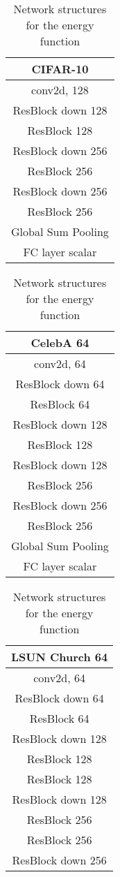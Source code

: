 \documentclass{article} \usepackage{iclr2021_conference,times}
\begin{document}
\begin{table}[ht]
\small
  \caption{Network structures for the energy function }\label{table net struct}
     \centering
     \begin{tabular}{c}
     CIFAR-10\\
     \hline
      conv2d, 128\\
     ResBlock down 128\\
     ResBlock 128\\
     ResBlock down 256\\
     ResBlock 256\\
     ResBlock down 256\\
     ResBlock 256\\
     Global Sum Pooling\\
     FC layer  scalar\\
     \hline
     \end{tabular}
     \quad
     \begin{tabular}{c}
     CelebA 64\\
     \hline
      conv2d, 64\\
     ResBlock down 64\\
     ResBlock 64\\
     ResBlock down 128\\
     ResBlock 128\\
     ResBlock down 128\\
     ResBlock 256\\
     ResBlock down 256\\
     ResBlock 256\\
     Global Sum Pooling\\
     FC layer  scalar\\
     \hline
     \end{tabular}
         \quad
    \begin{tabular}{c}
     LSUN Church 64\\
     \hline
      conv2d, 64\\
     ResBlock down 64\\
     ResBlock 64\\
     ResBlock down 128\\
     ResBlock 128\\
     ResBlock 128\\
     ResBlock down 128\\
     ResBlock 256\\
     ResBlock 256\\
     ResBlock down 256\\

\end{tabular}
\end{table}
\end{document}
